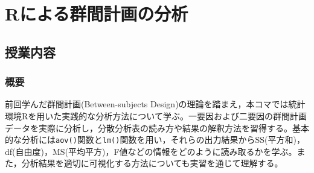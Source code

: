 \section{Rによる群間計画の分析}
\label{b19_BetweenDesign_onR}

\subsection{授業内容}
\subsubsection{概要}
前回学んだ群間計画(Between-subjects Design)の理論を踏まえ，本コマでは統計環境Rを用いた実践的な分析方法について学ぶ。一要因および二要因の群間計画データを実際に分析し，分散分析表の読み方や結果の解釈方法を習得する。基本的な分析には\verb|aov()|関数と\verb|lm()|関数を用い，それらの出力結果からSS(平方和)，df(自由度)，MS(平均平方)，F値などの情報をどのように読み取るかを学ぶ。また，分析結果を適切に可視化する方法についても実習を通じて理解する。

